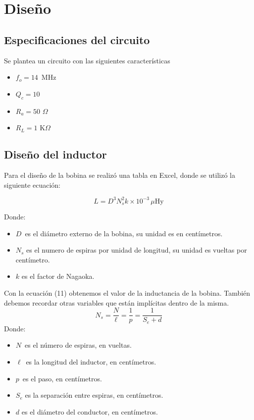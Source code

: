 
\section{Diseño}

\subsection{Especificaciones del circuito}
\bigskip
Se plantea un circuito con las siguientes características
\begin{itemize}
    \item \( f_o = 14 \, \) MHz
    \item \( Q_c = 10 \) 
    \item \( R_a = 50 \) $\Omega$
    \item \( R_L = 1 \) K$\Omega$ 
\end{itemize}

\subsection{Diseño del inductor}
Para el diseño de la bobina se realizó una tabla en Excel, donde se utilizó la siguiente ecuación:

\begin{equation}
    L = D^3 N_s^2 k \times 10^{-3} \, \mu \text{Hy}
\end{equation}

Donde:
\begin{itemize}
    \item \( D\, \) es el diámetro externo de la bobina, su unidad es en centímetros.
    \item \( N_s \) es el numero de espiras por unidad de longitud, su unidad es vueltas por centímetro.
    \item \( k\) es el factor de Nagaoka.
\end{itemize}
Con la ecuación (11) obtenemos el valor de la inductancia de la bobina. También debemos recordar otras variables que están implícitas dentro de la misma.
\begin{equation}
    N_s = \frac{N}{\ell} = \frac{1}{p} = \frac{1}{S_e+d}
\end{equation}
Donde:
\begin{itemize}
    \item \( N\, \) es el número de espiras, en vueltas.
    \item \( \ell\, \) es la longitud del inductor, en centímetros.
    \item \( p\, \) es el paso, en centímetros.
    \item \( S_e \) es la separación entre espiras, en centímetros. 
    \item \( d\) es el diámetro del conductor, en centímetros.
\end{itemize}


